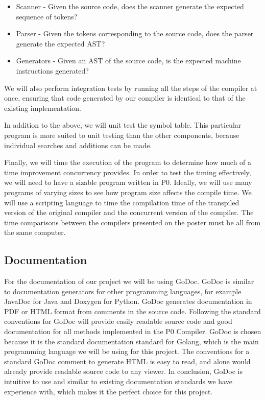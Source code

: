 \documentclass{article}
\begin{document}
\begin{itemize}
  \item Scanner - Given the source code, does the scanner generate the expected
    sequence of tokens?
  \item Parser - Given the tokens corresponding to the source code, does the
    parser generate the expected AST?
  \item Generators - Given an AST of the source code, is the expected machine
    instructions generated?
\end{itemize}

We will also perform integration tests by running all the steps of the compiler
at once, ensuring that code generated by our compiler is identical to that of
the existing implementation.

In addition to the above, we will unit test the symbol table.
This particular program is more suited to unit testing than the other components,
because individual searches and additions can be made.

Finally, we will time the execution of the program to determine how much of a
time improvement concurrency provides.
In order to test the timing effectively, we will need to have a sizable program
written in P0.
Ideally, we will use many programs of varying sizes to see how program size
affects the compile time.
We will use a scripting language to time the compilation time of the transpiled
version of the original compiler and the concurrent version of the compiler.
The time comparisons between the compilers presented on the poster must be all
from the same computer.

\subsection{Documentation} %

For the documentation of our project we will be using GoDoc. GoDoc is similar to documentation 
generators for other programming languages, for example JavaDoc for Java and Doxygen for Python. 
GoDoc generates documentation in PDF or HTML format from comments in the source code. 
Following the standard conventions for GoDoc will provide easily readable source code and good 
documentation for all methods implemented in the P0 Compiler. GoDoc is chosen because it is the standard documentation standard for Golang, 
which is the main programming language we will be using for this project. The conventions for a standard GoDoc comment to generate HTML
 is easy to read, and alone would already provide readable source code to any viewer. 
 In conclusion, GoDoc is intuitive to use and similar to existing documentation standards we have experience with, 
 which makes it the perfect choice for this project.
 
\end{document}
